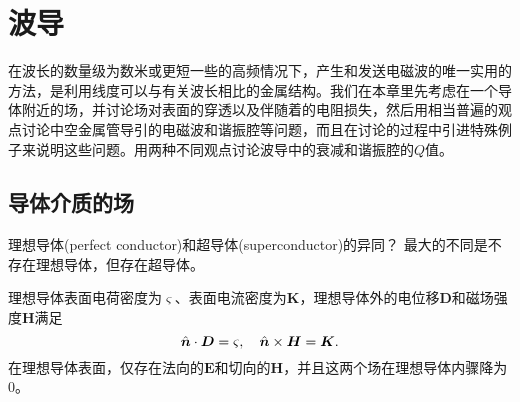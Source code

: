 \chapter{波导}
\label{chap:waveguide}
在波长的数量级为数米或更短一些的高频情况下，产生和发送电磁波的唯一实用的方法，是利用线度可以与有关波长相比的金属结构。我们在本章里先考虑在一个导体附近的场，并讨论场对表面的穿透以及伴随着的电阻损失，然后用相当普遍的观点讨论中空金属管导引的电磁波和谐振腔等问题，而且在讨论的过程中引进特殊例子来说明这些问题。用两种不同观点讨论波导中的衰减和谐振腔的$Q$值。%

\section{导体介质的场}
理想导体(perfect conductor)和超导体(superconductor)的异同？
最大的不同是不存在理想导体，但存在超导体。

理想导体表面电荷密度为$\varsigma$、表面电流密度为$\bm K$，理想导体外的电位移$\bm D$和磁场强度$\bm H$满足
\[
    \mathop{}\!\hat{\bm{n}}\cdot\bm D=\varsigma,\quad\mathop{}\!\hat{\bm{n}}\times\bm H=\bm K.
\]
在理想导体表面，仅存在法向的$\bm E$和切向的$\bm H$，并且这两个场在理想导体内骤降为0。

